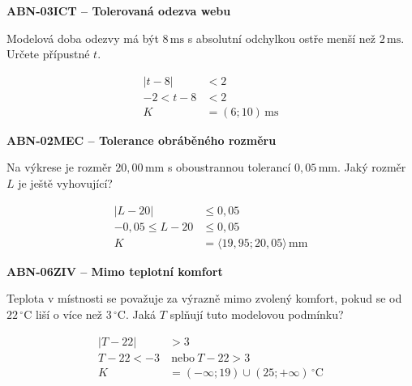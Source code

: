 \documentclass[11pt,a4paper]{article}
\begin{document}
\par\medskip\noindent
\textbf{ABN-03}\quad\textbf{ICT -- Tolerovaná odezva webu}\par
Modelová doba odezvy má být $8\,\mathrm{ms}$ s absolutní odchylkou ostře menší než $2\,\mathrm{ms}$. Určete přípustné $t$.
\par\[\begin{aligned}
|t-8|&<2\\-2<t-8&<2\\K&=(6;10)\,\mathrm{ms}
\end{aligned}\]
\par\medskip\noindent
\textbf{ABN-02}\quad\textbf{MEC -- Tolerance obráběného rozměru}\par
Na výkrese je rozměr $20{,}00\,\mathrm{mm}$ s oboustrannou tolerancí $0{,}05\,\mathrm{mm}$. Jaký rozměr $L$ je ještě vyhovující?
\par\[\begin{aligned}
|L-20|&\le0{,}05\\-0{,}05\le L-20&\le0{,}05\\K&=\langle19{,}95;20{,}05\rangle\,\mathrm{mm}
\end{aligned}\]
\par\medskip\noindent
\textbf{ABN-06}\quad\textbf{ZIV -- Mimo teplotní komfort}\par
Teplota v místnosti se považuje za výrazně mimo zvolený komfort, pokud se od $22\,{}^\circ\mathrm C$ liší o více než $3\,{}^\circ\mathrm C$. Jaká $T$ splňují tuto modelovou podmínku?
\par\[\begin{aligned}
|T-22|&>3\\T-22<-3&\ \text{nebo}\ T-22>3\\K&=(-\infty;19)\cup(25;+\infty)\,{}^\circ\mathrm C
\end{aligned}\]
\end{document}
